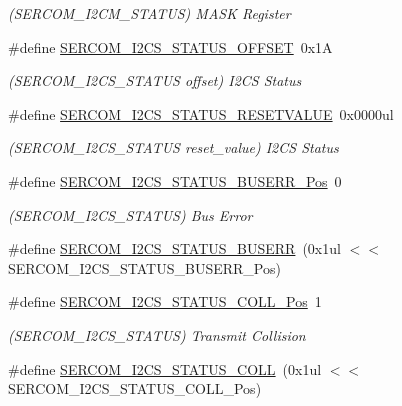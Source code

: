 \begin{DoxyCompactItemize}
\begin{DoxyCompactList}\small\item\em (S\+E\+R\+C\+O\+M\+\_\+\+I2\+C\+M\+\_\+\+S\+T\+A\+T\+US) M\+A\+SK Register \end{DoxyCompactList}\item 
\#define \mbox{\hyperlink{group___s_a_m_d21___s_e_r_c_o_m_ga50e5e24ad4bf0835469c6e8ca3b14992}{S\+E\+R\+C\+O\+M\+\_\+\+I2\+C\+S\+\_\+\+S\+T\+A\+T\+U\+S\+\_\+\+O\+F\+F\+S\+ET}}~0x1A
\begin{DoxyCompactList}\small\item\em (S\+E\+R\+C\+O\+M\+\_\+\+I2\+C\+S\+\_\+\+S\+T\+A\+T\+US offset) I2\+CS Status \end{DoxyCompactList}\item 
\#define \mbox{\hyperlink{group___s_a_m_d21___s_e_r_c_o_m_ga56aa9fcf9afe14b13caf1385149e69de}{S\+E\+R\+C\+O\+M\+\_\+\+I2\+C\+S\+\_\+\+S\+T\+A\+T\+U\+S\+\_\+\+R\+E\+S\+E\+T\+V\+A\+L\+UE}}~0x0000ul
\begin{DoxyCompactList}\small\item\em (S\+E\+R\+C\+O\+M\+\_\+\+I2\+C\+S\+\_\+\+S\+T\+A\+T\+US reset\+\_\+value) I2\+CS Status \end{DoxyCompactList}\item 
\#define \mbox{\hyperlink{group___s_a_m_d21___s_e_r_c_o_m_ga3b48f511b23dff0bf237db3d37ffa80f}{S\+E\+R\+C\+O\+M\+\_\+\+I2\+C\+S\+\_\+\+S\+T\+A\+T\+U\+S\+\_\+\+B\+U\+S\+E\+R\+R\+\_\+\+Pos}}~0
\begin{DoxyCompactList}\small\item\em (S\+E\+R\+C\+O\+M\+\_\+\+I2\+C\+S\+\_\+\+S\+T\+A\+T\+US) Bus Error \end{DoxyCompactList}\item 
\#define \mbox{\hyperlink{group___s_a_m_d21___s_e_r_c_o_m_gabf88cdf0be2d4aafe3cec04bf46de5d7}{S\+E\+R\+C\+O\+M\+\_\+\+I2\+C\+S\+\_\+\+S\+T\+A\+T\+U\+S\+\_\+\+B\+U\+S\+E\+RR}}~(0x1ul $<$$<$ S\+E\+R\+C\+O\+M\+\_\+\+I2\+C\+S\+\_\+\+S\+T\+A\+T\+U\+S\+\_\+\+B\+U\+S\+E\+R\+R\+\_\+\+Pos)
\item 
\#define \mbox{\hyperlink{group___s_a_m_d21___s_e_r_c_o_m_gae79635852dcf1603b0b0a97773e4bfe5}{S\+E\+R\+C\+O\+M\+\_\+\+I2\+C\+S\+\_\+\+S\+T\+A\+T\+U\+S\+\_\+\+C\+O\+L\+L\+\_\+\+Pos}}~1
\begin{DoxyCompactList}\small\item\em (S\+E\+R\+C\+O\+M\+\_\+\+I2\+C\+S\+\_\+\+S\+T\+A\+T\+US) Transmit Collision \end{DoxyCompactList}\item 
\#define \mbox{\hyperlink{group___s_a_m_d21___s_e_r_c_o_m_gae22da0f3dc57b404ab270a5e1e8fe77b}{S\+E\+R\+C\+O\+M\+\_\+\+I2\+C\+S\+\_\+\+S\+T\+A\+T\+U\+S\+\_\+\+C\+O\+LL}}~(0x1ul $<$$<$ S\+E\+R\+C\+O\+M\+\_\+\+I2\+C\+S\+\_\+\+S\+T\+A\+T\+U\+S\+\_\+\+C\+O\+L\+L\+\_\+\+Pos)

\end{DoxyCompactItemize}
